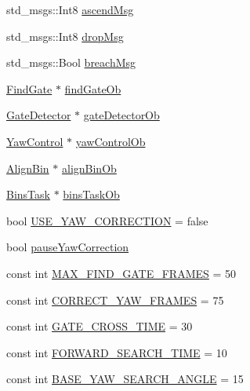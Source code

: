\begin{DoxyCompactItemize}
\item 
std\+\_\+msgs\+::\+Int8 \hyperlink{classPathPlanner_a5abd76dde4ea570d1f558336ac13f3e4}{ascend\+Msg}
\item 
std\+\_\+msgs\+::\+Int8 \hyperlink{classPathPlanner_aca9f8a364babea5db6c9ff8cc98addbc}{drop\+Msg}
\item 
std\+\_\+msgs\+::\+Bool \hyperlink{classPathPlanner_a1ac63d92d2bee1644f7b2e80d6cc5c09}{breach\+Msg}
\item 
\hyperlink{classFindGate}{Find\+Gate} $\ast$ \hyperlink{classPathPlanner_a411050611aa7ccad2bcbfe8aa8c8698f}{find\+Gate\+Ob}
\item 
\hyperlink{classGateDetector}{Gate\+Detector} $\ast$ \hyperlink{classPathPlanner_af11812439e12931a6f3d744e358e91e4}{gate\+Detector\+Ob}
\item 
\hyperlink{classYawControl}{Yaw\+Control} $\ast$ \hyperlink{classPathPlanner_a8abc38307d93b4feecb14a8ece4764a6}{yaw\+Control\+Ob}
\item 
\hyperlink{classAlignBin}{Align\+Bin} $\ast$ \hyperlink{classPathPlanner_a2953c40a460f99cf2b767b5ab5cb7f3e}{align\+Bin\+Ob}
\item 
\hyperlink{classBinsTask}{Bins\+Task} $\ast$ \hyperlink{classPathPlanner_ab66992788cfdfc1a443bfa97af547100}{bins\+Task\+Ob}
\item 
bool \hyperlink{classPathPlanner_a54e431dfde30e0b15a372c5a16c8dd6c}{U\+S\+E\+\_\+\+Y\+A\+W\+\_\+\+C\+O\+R\+R\+E\+C\+T\+I\+ON} = false
\item 
bool \hyperlink{classPathPlanner_a15a968b0bc50d230bbc22e9099377504}{pause\+Yaw\+Correction}
\item 
const int \hyperlink{classPathPlanner_ada301b950a4d1b14acd2477fbc5f73df}{M\+A\+X\+\_\+\+F\+I\+N\+D\+\_\+\+G\+A\+T\+E\+\_\+\+F\+R\+A\+M\+ES} = 50
\item 
const int \hyperlink{classPathPlanner_ab80757ecd2962cc2e5bd64c300e31628}{C\+O\+R\+R\+E\+C\+T\+\_\+\+Y\+A\+W\+\_\+\+F\+R\+A\+M\+ES} = 75
\item 
const int \hyperlink{classPathPlanner_a11a499117aadaae4036d58bd4b63d7ac}{G\+A\+T\+E\+\_\+\+C\+R\+O\+S\+S\+\_\+\+T\+I\+ME} = 30
\item 
const int \hyperlink{classPathPlanner_a12b219c458ee64a02f3255f76ad63be6}{F\+O\+R\+W\+A\+R\+D\+\_\+\+S\+E\+A\+R\+C\+H\+\_\+\+T\+I\+ME} = 10
\item 
const int \hyperlink{classPathPlanner_a683836da96618f1a2d6e153ef74e55a8}{B\+A\+S\+E\+\_\+\+Y\+A\+W\+\_\+\+S\+E\+A\+R\+C\+H\+\_\+\+A\+N\+G\+LE} = 15
\item 

\end{DoxyCompactItemize}
